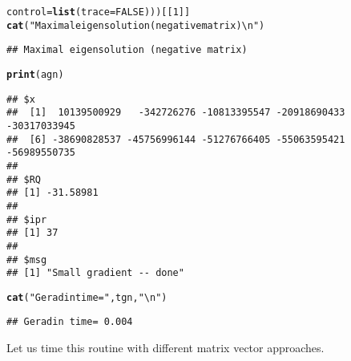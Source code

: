 \documentclass[10pt]{article}\usepackage[]{graphicx}\usepackage[]{color}
\makeatletter
\newcommand{\hlnum}[1]{\textcolor[rgb]{0.686,0.059,0.569}{#1}}%
\newcommand{\hlstr}[1]{\textcolor[rgb]{0.192,0.494,0.8}{#1}}%
\newcommand{\hlstd}[1]{\textcolor[rgb]{0.345,0.345,0.345}{#1}}%
\newcommand{\hlkwc}[1]{\textcolor[rgb]{0.333,0.667,0.333}{#1}}%
\newcommand{\hlkwd}[1]{\textcolor[rgb]{0.737,0.353,0.396}{\textbf{#1}}}%
\newenvironment{kframe}{%
 \def\at@end@of@kframe{}%
 \ifinner\ifhmode%
  \def\at@end@of@kframe{\end{minipage}}%
  \begin{minipage}{\columnwidth}%
 \fi\fi%
 \def\FrameCommand##1{\hskip\@totalleftmargin \hskip-\fboxsep
 \colorbox{shadecolor}{##1}\hskip-\fboxsep
     \hskip-\linewidth \hskip-\@totalleftmargin \hskip\columnwidth}%
 \MakeFramed {\advance\hsize-\width
   \@totalleftmargin\z@ \linewidth\hsize
   \@setminipage}}%
 {\par\unskip\endMakeFramed%
 \at@end@of@kframe}
\newenvironment{knitrout}{}{} %
\makeatother
\begin{document}
\begin{knitrout}
\begin{kframe}
\begin{alltt}
   \hlkwc{control}\hlstd{=}\hlkwd{list}\hlstd{(}\hlkwc{trace}\hlstd{=}\hlnum{FALSE}\hlstd{)))[[}\hlnum{1}\hlstd{]]}
\hlkwd{cat}\hlstd{(}\hlstr{"Maximal eigensolution (negative matrix)\textbackslash{}n"}\hlstd{)}
\end{alltt}
\begin{verbatim}
## Maximal eigensolution (negative matrix)
\end{verbatim}
\begin{alltt}
\hlkwd{print}\hlstd{(agn)}
\end{alltt}
\begin{verbatim}
## $x
##  [1]  10139500929   -342726276 -10813395547 -20918690433 -30317033945
##  [6] -38690828537 -45756996144 -51276766405 -55063595421 -56989550735
## 
## $RQ
## [1] -31.58981
## 
## $ipr
## [1] 37
## 
## $msg
## [1] "Small gradient -- done"
\end{verbatim}
\begin{alltt}
\hlkwd{cat}\hlstd{(}\hlstr{"Geradin time="}\hlstd{,tgn,}\hlstr{"\textbackslash{}n"}\hlstd{)}
\end{alltt}
\begin{verbatim}
## Geradin time= 0.004
\end{verbatim}
\end{kframe}
\end{knitrout}

Let us time this routine with different matrix vector approaches.
\end{document}
